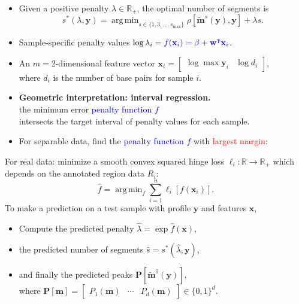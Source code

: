 \documentclass[legalpaper]{article}
\newcommand{\RR}{\mathbb R}
\DeclareMathOperator*{\argmin}{arg\,min}
\begin{document}
\begin{itemize}
\item Given a positive penalty $\lambda\in\RR_+$, the optimal number
  of segments is
\begin{equation*} s^*(\lambda, \mathbf y) =
    \argmin_{s\in\{1,3,\dots, s_{\text{max}}\}} \rho\left[
      \mathbf{\tilde m}^s(\mathbf y), \mathbf y \right] + \lambda s.
\end{equation*}
\item Sample-specific penalty values $\log \lambda_i = 
\textcolor{blue}{
  f(\mathbf x_i)
  = \beta + \mathbf w^\intercal \mathbf x_i
}$.
\item An $m=2$-dimensional feature vector
$\mathbf x_i = \left[\begin{array}{cc} \log\max \mathbf y_i & \log d_i
\end{array}\right]$,\\ where $d_i$ is the number of base pairs for 
sample $i$.
\item \textbf{Geometric interpretation: interval regression.} \\
  the minimum error
  \textcolor{blue}{penalty function $f$} \\
  intersects the target
  interval of penalty values for each sample.
\item For separable data, find the 
  \textcolor{blue}{penalty function $f$} 
with
\textcolor{red}{largest margin}:\\

\end{itemize}

\newpage

For real data: minimize a smooth convex squared hinge loss
$\ell_i:\RR\rightarrow\RR_+$ which depends on the annotated region
data $R_i$:
\begin{equation*}
  \label{eq:relax}
  \hat f = \argmin_f \sum_{i=1}^n
  \ell_i\left[ f(\mathbf x_i) \right].
\end{equation*}
To make a prediction on a
test sample with profile $\mathbf y$ and features $\mathbf x$,
\begin{itemize}
\item Compute the predicted penalty $\hat \lambda = \exp \hat f(\mathbf x)$,
\item the predicted number of segments $\hat s = s^*(\hat \lambda, \mathbf
y)$, 
\item and finally the predicted peaks $\mathbf P\left[ \mathbf{\tilde
    m}^{\hat s}(\mathbf y) \right]$,\\
where $\mathbf P[\mathbf m] = \left[\begin{array}{ccc}
    P_1(\mathbf m) & \cdots & P_d(\mathbf m)
\end{array}\right]\in\{0, 1\}^d$.
\end{itemize}
\end{document}
